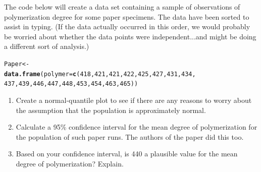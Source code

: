 \documentclass[twoside]{book}\usepackage[]{graphicx}\usepackage[]{xcolor}
\makeatletter
\newcommand{\hlnum}[1]{\textcolor[rgb]{0.686,0.059,0.569}{#1}}%
\newcommand{\hlstd}[1]{\textcolor[rgb]{0.345,0.345,0.345}{#1}}%
\newcommand{\hlkwb}[1]{\textcolor[rgb]{0.69,0.353,0.396}{#1}}%
\newcommand{\hlkwc}[1]{\textcolor[rgb]{0.333,0.667,0.333}{#1}}%
\newcommand{\hlkwd}[1]{\textcolor[rgb]{0.737,0.353,0.396}{\textbf{#1}}}%
\newenvironment{kframe}{%
 \def\at@end@of@kframe{}%
 \ifinner\ifhmode%
  \def\at@end@of@kframe{\end{minipage}}%
  \begin{minipage}{\columnwidth}%
 \fi\fi%
 \def\FrameCommand##1{\hskip\@totalleftmargin \hskip-\fboxsep
 \colorbox{shadecolor}{##1}\hskip-\fboxsep
     \hskip-\linewidth \hskip-\@totalleftmargin \hskip\columnwidth}%
 \MakeFramed {\advance\hsize-\width
   \@totalleftmargin\z@ \linewidth\hsize
   \@setminipage}}%
 {\par\unskip\endMakeFramed%
 \at@end@of@kframe}
\newenvironment{knitrout}{}{} %
\makeatother
\begin{document}
\begin{problem}
	The code below will create a data set containing a sample of observations
	of polymerization degree for some paper specimens.  The data have been 
	sorted to assist in typing.  (If the data actually occurred in this order,
	we would probably be worried about whether the data points were independent...and might be doing a different sort of analysis.)
\begin{knitrout}
\color{fgcolor}\begin{kframe}
\begin{alltt}
\hlstd{Paper} \hlkwb{<-}
        \hlkwd{data.frame}\hlstd{(} \hlkwc{polymer} \hlstd{=} \hlkwd{c}\hlstd{(} \hlnum{418}\hlstd{,} \hlnum{421}\hlstd{,} \hlnum{421}\hlstd{,} \hlnum{422}\hlstd{,} \hlnum{425}\hlstd{,} \hlnum{427}\hlstd{,} \hlnum{431}\hlstd{,} \hlnum{434}\hlstd{,}
                                                        \hlnum{437}\hlstd{,} \hlnum{439}\hlstd{,} \hlnum{446}\hlstd{,} \hlnum{447}\hlstd{,} \hlnum{448}\hlstd{,} \hlnum{453}\hlstd{,} \hlnum{454}\hlstd{,} \hlnum{463}\hlstd{,} \hlnum{465}\hlstd{) )}
\end{alltt}
\end{kframe}
\end{knitrout}
	\begin{enumerate}
		\item Create a normal-quantile plot to see if there are any reasons
			to worry about the assumption that the population is approximately normal.
		\item
				Calculate 
				a 95\% confidence interval for the mean
				degree of polymerization for the population of such paper runs.
				The authors of the paper did this too.
		\item
			Based on your confidence interval, is 440 a plausible value
			for the mean degree of polymerization?  Explain.
	\end{enumerate}
\end{problem}
\end{document}
